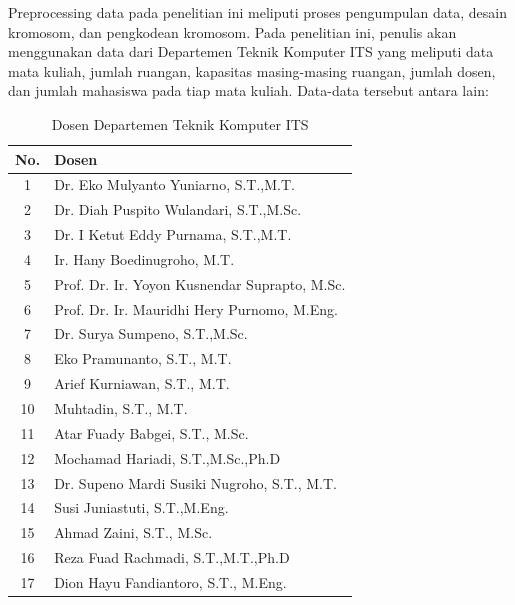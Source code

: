   Preprocessing data pada penelitian ini meliputi proses pengumpulan data, desain kromosom, dan pengkodean kromosom. Pada penelitian ini, penulis akan menggunakan data dari Departemen Teknik Komputer ITS yang meliputi data mata kuliah, 
  jumlah ruangan, kapasitas masing-masing ruangan, jumlah dosen, dan jumlah mahasiswa pada tiap mata kuliah. Data-data tersebut antara lain:
  \begin{longtable}{|c|l|}
    \caption{Dosen Departemen Teknik Komputer ITS}
    \label{tb:DosenTekkom} \\
    \hline
    \rowcolor[HTML]{C0C0C0} 
    No. & Dosen                                         \\ \hline
    1   & Dr. Eko Mulyanto Yuniarno, S.T.,M.T.          \\ 
    2   & Dr. Diah Puspito Wulandari, S.T.,M.Sc.        \\ 
    3   & Dr. I Ketut Eddy Purnama, S.T.,M.T.           \\ 
    4   & Ir. Hany Boedinugroho, M.T.                   \\ 
    5   & Prof. Dr. Ir. Yoyon Kusnendar Suprapto, M.Sc. \\ 
    6   & Prof. Dr. Ir. Mauridhi Hery Purnomo, M.Eng.   \\ 
    7   & Dr. Surya Sumpeno, S.T.,M.Sc.                 \\ 
    8   & Eko Pramunanto, S.T., M.T.                    \\ 
    9   & Arief Kurniawan, S.T., M.T.                   \\ 
    10  & Muhtadin, S.T., M.T.                          \\ 
    11  & Atar Fuady Babgei, S.T., M.Sc.                \\ 
    12  & Mochamad Hariadi, S.T.,M.Sc.,Ph.D             \\ 
    13  & Dr. Supeno Mardi Susiki Nugroho, S.T., M.T.   \\ 
    14  & Susi Juniastuti, S.T.,M.Eng.                  \\ 
    15  & Ahmad Zaini, S.T., M.Sc.                      \\ 
    16  & Reza Fuad Rachmadi, S.T.,M.T.,Ph.D            \\ 
    17  & Dion Hayu Fandiantoro, S.T., M.Eng.           \\ 
    \hline
  \end{longtable}

